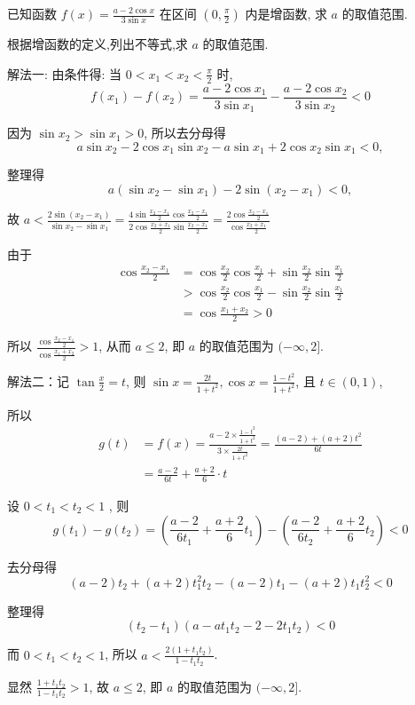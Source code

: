 \begin{example}
	已知函数 $f(x)=\frac{a-2 \cos x}{3 \sin x}$ 在区间 $\left(0, \frac{\pi}{2}\right)$ 内是增函数, 求 $a$ 的取值范围.
\end{example}
\begin{analysis}
	根据增函数的定义,列出不等式,求 $a$ 的取值范围.
\end{analysis}
\begin{solution}
	解法一: 由条件得: 当 $0<x_{1}<x_{2}<\frac{\pi}{2}$ 时,
	$$
		f\left(x_{1}\right)-f\left(x_{2}\right)=\frac{a-2 \cos x_{1}}{3 \sin x_{1}}-\frac{a-2 \cos x_{2}}{3 \sin x_{2}}<0
	$$

	因为 $\sin x_{2}>\sin x_{1}>0$, 所以去分母得
	$$
		a \sin x_{2}-2 \cos x_{1} \sin x_{2}-a \sin x_{1}+2 \cos x_{2} \sin x_{1}<0,
	$$

	整理得
	$$
		a\left(\sin x_{2}-\sin x_{1}\right)-2 \sin \left(x_{2}-x_{1}\right)<0,
	$$

	故
	$a<\frac{2 \sin \left(x_{2}-x_{1}\right)}{\sin x_{2}-\sin x_{1}}=\frac{4 \sin \frac{x_{2}-x_{1}}{2} \cos \frac{x_{2}-x_{1}}{2}}{2 \cos \frac{x_{2}+x_{1}}{2} \sin \frac{x_{2}-x_{1}}{2}}=\frac{2 \cos \frac{x_{2}-x_{1}}{2}}{\cos \frac{x_{2}+x_{1}}{2}}$

	由于
	\begin{align}
		\cos \frac{x_{2}-x_{1}}{2} & =\cos \frac{x_{2}}{2} \cos \frac{x_{1}}{2}+\sin \frac{x_{2}}{2} \sin \frac{x_{1}}{2} \\
		                           & >\cos \frac{x_{2}}{2} \cos \frac{x_{1}}{2}-\sin \frac{x_{2}}{2} \sin \frac{x_{1}}{2} \\
		                           & =\cos \frac{x_{1}+x_{2}}{2}>0
	\end{align}

	所以 $\frac{\cos \frac{x_{2}-x_{1}}{2}}{\cos \frac{x_{1}+x_{2}}{2}}>1$, 从而 $a \leqslant 2$, 即 $a$ 的取值范围为 $(-\infty, 2]$.

	解法二：记 $\tan \frac{x}{2}=t$, 则 $\sin x=\frac{2 t}{1+t^{2}}, \cos x=\frac{1-t^{2}}{1+t^{2}}$, 且 $t \in(0,1)$,

	所以
	$$
		\begin{aligned}
			g(t) & =f(x)=\frac{a-2 \times \frac{1-t^{2}}{1+t^{2}}}{3 \times \frac{2 t}{1+t^{2}}}=\frac{(a-2)+(a+2) t^{2}}{6 t} \\
			     & =\frac{a-2}{6 t}+\frac{a+2}{6} \cdot t
		\end{aligned}
	$$

	设 $0<t_{1}<t_{2}<1$ , 则
	$$
		g\left(t_{1}\right)-g\left(t_{2}\right)=\left(\frac{a-2}{6 t_{1}}+\frac{a+2}{6} t_{1}\right)-\left(\frac{a-2}{6 t_{2}}+\frac{a+2}{6} t_{2}\right)<0
	$$

	去分母得
	$$
		(a-2) t_{2}+(a+2) t_{1}^{2} t_{2}-(a-2) t_{1}-(a+2) t_{1} t_{2}^{2}<0
	$$

	整理得
	$$
		\left(t_{2}-t_{1}\right)\left(a-a t_{1} t_{2}-2-2 t_{1} t_{2}\right)<0
	$$

	而 $0<t_{1}<t_{2}<1$, 所以 $a<\frac{2\left(1+t_{1} t_{2}\right)}{1-t_{1} t_{2}}$.

	显然 $\frac{1+t_{1} t_{2}}{1-t_{1} t_{2}}>1$, 故 $a \leqslant 2$, 即 $a$ 的取值范围为 $(-\infty, 2]$.
\end{solution}
